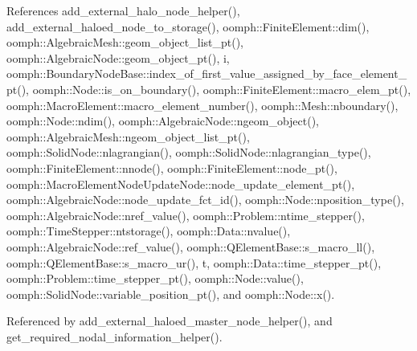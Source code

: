 References add\+\_\+external\+\_\+halo\+\_\+node\+\_\+helper(), add\+\_\+external\+\_\+haloed\+\_\+node\+\_\+to\+\_\+storage(), oomph\+::\+Finite\+Element\+::dim(), oomph\+::\+Algebraic\+Mesh\+::geom\+\_\+object\+\_\+list\+\_\+pt(), oomph\+::\+Algebraic\+Node\+::geom\+\_\+object\+\_\+pt(), i, oomph\+::\+Boundary\+Node\+Base\+::index\+\_\+of\+\_\+first\+\_\+value\+\_\+assigned\+\_\+by\+\_\+face\+\_\+element\+\_\+pt(), oomph\+::\+Node\+::is\+\_\+on\+\_\+boundary(), oomph\+::\+Finite\+Element\+::macro\+\_\+elem\+\_\+pt(), oomph\+::\+Macro\+Element\+::macro\+\_\+element\+\_\+number(), oomph\+::\+Mesh\+::nboundary(), oomph\+::\+Node\+::ndim(), oomph\+::\+Algebraic\+Node\+::ngeom\+\_\+object(), oomph\+::\+Algebraic\+Mesh\+::ngeom\+\_\+object\+\_\+list\+\_\+pt(), oomph\+::\+Solid\+Node\+::nlagrangian(), oomph\+::\+Solid\+Node\+::nlagrangian\+\_\+type(), oomph\+::\+Finite\+Element\+::nnode(), oomph\+::\+Finite\+Element\+::node\+\_\+pt(), oomph\+::\+Macro\+Element\+Node\+Update\+Node\+::node\+\_\+update\+\_\+element\+\_\+pt(), oomph\+::\+Algebraic\+Node\+::node\+\_\+update\+\_\+fct\+\_\+id(), oomph\+::\+Node\+::nposition\+\_\+type(), oomph\+::\+Algebraic\+Node\+::nref\+\_\+value(), oomph\+::\+Problem\+::ntime\+\_\+stepper(), oomph\+::\+Time\+Stepper\+::ntstorage(), oomph\+::\+Data\+::nvalue(), oomph\+::\+Algebraic\+Node\+::ref\+\_\+value(), oomph\+::\+Q\+Element\+Base\+::s\+\_\+macro\+\_\+ll(), oomph\+::\+Q\+Element\+Base\+::s\+\_\+macro\+\_\+ur(), t, oomph\+::\+Data\+::time\+\_\+stepper\+\_\+pt(), oomph\+::\+Problem\+::time\+\_\+stepper\+\_\+pt(), oomph\+::\+Node\+::value(), oomph\+::\+Solid\+Node\+::variable\+\_\+position\+\_\+pt(), and oomph\+::\+Node\+::x().



Referenced by add\+\_\+external\+\_\+haloed\+\_\+master\+\_\+node\+\_\+helper(), and get\+\_\+required\+\_\+nodal\+\_\+information\+\_\+helper().

\mbox{\label{namespaceoomph_1_1Multi__domain__functions_aaf7f6048aab50adfe33d24f8ff9f8390}} 
